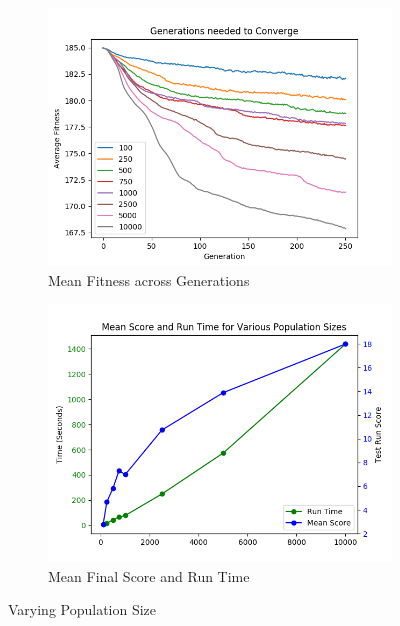 \documentclass[12pt]{article}
\begin{document}
\begin{figure}[ht]
\centering
\begin{subfigure}{0.5\textwidth}
\centering
\includegraphics[width=1\textwidth]{Figures/convergence}
\caption{Mean Fitness across Generations}
\label{fig:pop_convergence}
\end{subfigure}%
\begin{subfigure}{0.5\textwidth}
\centering
\includegraphics[width=1\textwidth]{Figures/meanscore_v_runtime}
\caption{Mean Final Score and Run Time}
\label{fig:meanscore_v_runtime}
\end{subfigure}

\caption{Varying Population Size}
\label{fig:varying_population_size}
\end{figure}
\end{document}
